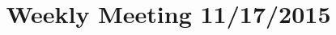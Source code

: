 \documentclass{sig-alternate}
\begin{document}


\title{Weekly Meeting 11/17/2015} %
%
%

%
%
%

\maketitle




%
%
%
%

 

%
\end{document}
